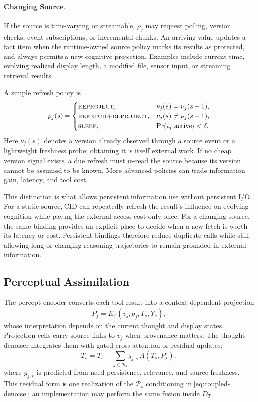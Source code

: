 \paragraph{Changing Source.}
If the source is time-varying or streamable, $\rho_j$ may request polling, version checks, event subscriptions, or incremental chunks. An arriving value updates a fact item when the runtime-owned source policy marks its results as protected, and always permits a new cognitive projection. Examples include current time, evolving realized display length, a modified file, sensor input, or streaming retrieval results.

A simple refresh policy is
\begin{equation}
  \rho_j(s)=
  \begin{cases}
    \textsc{reproject}, & \nu_j(s)=\nu_j(s-1),\\
    \textsc{refetch+reproject}, & \nu_j(s)\neq\nu_j(s-1),\\
    \textsc{sleep}, & \Pr(i_j\text{ active})<\delta.
  \end{cases}
  \label{eq:refresh-policy}
\end{equation}
Here $\nu_j(s)$ denotes a version already observed through a source event or a lightweight freshness probe; obtaining it is itself external work. If no cheap version signal exists, a due refresh must re-read the source because its version cannot be assumed to be known. More advanced policies can trade information gain, latency, and tool cost.

This distinction is what allows persistent information use without persistent I/O. For a static source, CID can repeatedly refresh the result's influence on evolving cognition while paying the external access cost only once. For a changing source, the same binding provides an explicit place to decide when a new fetch is worth its latency or cost. Persistent bindings therefore reduce duplicate calls while still allowing long or changing reasoning trajectories to remain grounded in external information.

\subsection{Perceptual Assimilation}
\label{sec:assimilation}

The percept encoder converts each tool result into a context-dependent projection
\begin{equation}
  P_j^s = E_{\psi}(v_j, p_j, T_s, Y_s),
  \label{eq:percept-projection}
\end{equation}
whose interpretation depends on the current thought and display states. Projection cells carry source links to $v_j$ when provenance matters. The thought denoiser integrates them with gated cross-attention or residual updates:
\begin{equation}
  \widetilde{T}_s = T_s + \sum_{j\in\mathcal{B}_s} g_{j,s}\,A(T_s,P_j^s),
  \label{eq:percept-assimilation}
\end{equation}
where $g_{j,s}$ is predicted from need persistence, relevance, and source freshness. This residual form is one realization of the $\mathcal{P}_s$ conditioning in \cref{eq:coupled-denoise}; an implementation may perform the same fusion inside $D_T$.

